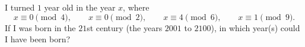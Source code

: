 I turned $1$ year old in the year $x$, where
\[x\equiv0\pmod4,\qquad x\equiv0\pmod2,\qquad x\equiv4\pmod6,\qquad x\equiv1\pmod9.\]
If I was born in the $21$st century (the years $2001$ to $2100$), in which year(s) could I have been born?
